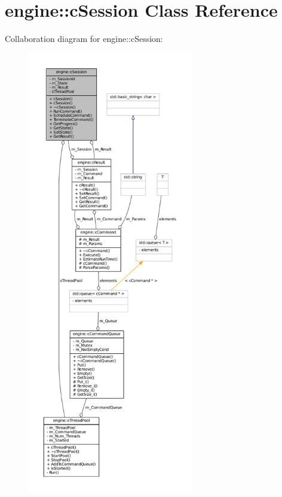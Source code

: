 \hypertarget{classengine_1_1cSession}{
\section{engine\-:\-:c\-Session \-Class \-Reference}
\label{classengine_1_1cSession}
}


\-Collaboration diagram for engine\-:\-:c\-Session\-:\nopagebreak
\begin{figure}[H]
\begin{center}
\leavevmode
\includegraphics[height=550pt]{classengine_1_1cSession__coll__graph}
\end{center}
\end{figure}
